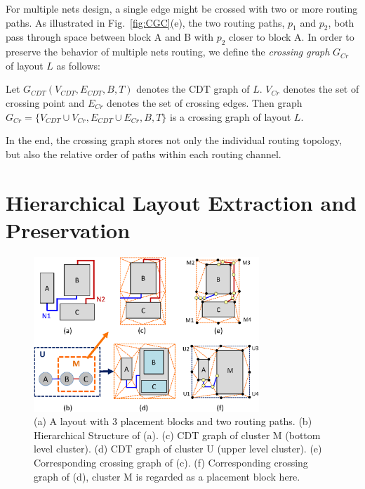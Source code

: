     For multiple nets design, a single edge might be crossed with two or more routing paths. As illustrated in Fig.~\ref{fig:CGC}(e), the two routing paths, $p_1$ and $p_2$, both pass through space between block A and B with $p_2$ closer to block A. In order to preserve the behavior of multiple nets routing, we define the {\it crossing graph} $G_{Cr}$ of layout $L$ as follows:
    \vspace{0.2cm}
    \begin{defi}\label{defi:CrossGraph}
      Let $G_{CDT}(V_{CDT},E_{CDT},B,T)$ denotes the CDT graph of $L$. $V_{Cr}$ denotes the set of crossing point and $E_{Cr}$ denotes the set of crossing edges. Then graph $G_{Cr} = \{V_{CDT} \cup V_{Cr},E_{CDT} \cup E_{Cr},B,T\}$ is a crossing graph of layout $L$. 
    \end{defi}
    \vspace{0.2cm}
    In the end, the crossing graph stores not only the individual routing topology, but also the relative order of paths within each routing channel.


  \section{Hierarchical Layout Extraction and Preservation}\label{sec:HLE}

    \begin{figure}[t]
      \begin{center}
      \includegraphics[width=8.5cm]{Fig/HIER.eps}
      \caption{
         (a) A layout with 3 placement blocks and two routing paths. 
         (b) Hierarchical Structure of (a).
         (c) CDT graph of cluster M (bottom level cluster).
         (d) CDT graph of cluster U (upper level cluster).
         (e) Corresponding crossing graph of (c).
         (f) Corresponding crossing graph of (d), cluster M is regarded as a placement block here.
        }
      \label{fig:HIER}
      \end{center}
    \end{figure}

